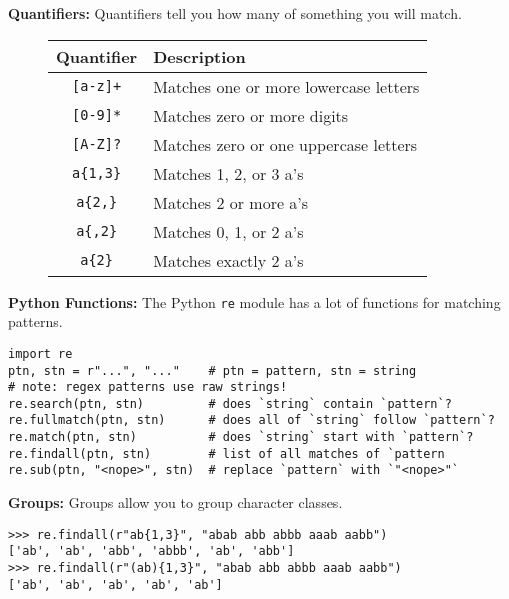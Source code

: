 \textbf{Quantifiers:}
Quantifiers tell you how many of something you will match.
\begin{figure}[h]
\begin{tabular}{| c | l | } \hline
    Quantifier & Description \\ \hline
    \lstinline$[a-z]+$ & Matches one or more lowercase letters \\ \hline
    \lstinline$[0-9]*$ & Matches zero or more digits \\ \hline
    \lstinline$[A-Z]?$ & Matches zero or one uppercase letters \\ \hline
    \lstinline$a{1,3}$ & Matches 1, 2, or 3 a's \\ \hline
    \lstinline$a{2,}$ & Matches 2 or more a's \\ \hline
    \lstinline$a{,2}$ & Matches 0, 1, or 2 a's \\ \hline
    \lstinline$a{2}$ & Matches exactly 2 a's \\ \hline
\end{tabular}
\end{figure}

\newpage
\textbf{Python Functions:}
The Python \lstinline$re$ module has a lot of functions for matching patterns.

\begin{lstlisting}
import re
ptn, stn = r"...", "..."    # ptn = pattern, stn = string
# note: regex patterns use raw strings!
re.search(ptn, stn)         # does `string` contain `pattern`?
re.fullmatch(ptn, stn)      # does all of `string` follow `pattern`?
re.match(ptn, stn)          # does `string` start with `pattern`?
re.findall(ptn, stn)        # list of all matches of `pattern
re.sub(ptn, "<nope>", stn)  # replace `pattern` with `"<nope>"`
\end{lstlisting}

\textbf{Groups:}
Groups allow you to group character classes.
\begin{lstlisting}
>>> re.findall(r"ab{1,3}", "abab abb abbb aaab aabb")
['ab', 'ab', 'abb', 'abbb', 'ab', 'abb']
>>> re.findall(r"(ab){1,3}", "abab abb abbb aaab aabb")
['ab', 'ab', 'ab', 'ab', 'ab']
\end{lstlisting}

